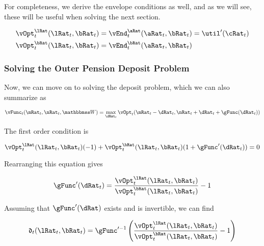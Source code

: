 \documentclass[\econtexRoot/HAFiscal]{subfiles}
\begin{document}
For completeness, we derive the envelope conditions as well, and as we will
see, these will be useful when solving the next section.

\begin{equation}
    \begin{split}
        \vOpt_{t}^{\lRat}(\lRat_{t}, \bRat_{t}) & =
        \vEnd_{t}^{\aRat}(\aRat_{t}, \bRat_{t}) = \util'(\cRat_{t}) \\
        \vOpt_{t}^{\bRat}(\lRat_{t}, \bRat_{t}) & =
        \vEnd_{t}^{\bRat}(\aRat_{t}, \bRat_{t})
    \end{split}
\end{equation}

\subsubsection{Solving the Outer Pension Deposit Problem}

Now, we can move on to solving the deposit problem, which we can also summarize
as

\begin{equation}
    \vFunc_{t}(\mRat_{t}, \nRat_{t}, \Work) = \max_{\dRat_{t}}
    \vOpt_{t}(\mRat_{t}
    - \dRat_{t}, \nRat_{t} + \dRat_{t} + \gFunc(\dRat_{t}))
\end{equation}

The first order condition is

\begin{equation}
    \vOpt_{t}^{\lRat}(\lRat_{t}, \bRat_{t})(-1) +
    \vOpt_{t}^{\bRat}(\lRat_{t}, \bRat_{t})(1+\gFunc'(\dRat_{t})) = 0
\end{equation}

Rearranging this equation gives

\begin{equation}
    \gFunc'(\dRat_{t}) = \frac{\vOpt_{t}^{\lRat}(\lRat_{t},
        \bRat_{t})}{\vOpt_{t}^{\bRat}(\lRat_{t}, \bRat_{t})} - 1
\end{equation}

Assuming that $\gFunc'(\dRat)$ exists and is invertible, we can find

\providecommand{\dEndFunc}{\ensuremath{\mathfrak{d}}}

\begin{equation}
    \dEndFunc_{t}(\lRat_{t}, \bRat_{t}) = \gFunc'^{-1}\left(
    \frac{\vOpt_{t}^{\lRat}(\lRat_{t},
        \bRat_{t})}{\vOpt_{t}^{\bRat}(\lRat_{t},
        \bRat_{t})} - 1 \right)
\end{equation}
\end{document}
